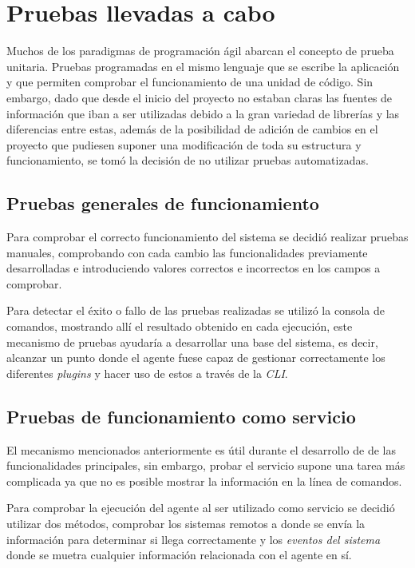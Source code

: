 \section{Pruebas llevadas a cabo} \label{sec:pru}
    
    Muchos de los paradigmas de programación ágil abarcan el concepto de prueba unitaria. Pruebas programadas en el mismo lenguaje que se escribe la aplicación y que permiten comprobar el funcionamiento de una unidad de código. Sin embargo, dado que desde el inicio del proyecto no estaban claras las fuentes de información que iban a ser utilizadas debido a la gran variedad de librerías y las diferencias entre estas, además de la posibilidad de adición de cambios en el proyecto que pudiesen suponer una modificación de toda su estructura y funcionamiento, se tomó la decisión de no utilizar pruebas automatizadas.
    
    \subsection{Pruebas generales de funcionamiento}
        Para comprobar el correcto funcionamiento del sistema se decidió realizar pruebas manuales, comprobando con cada cambio las funcionalidades previamente desarrolladas e introduciendo valores correctos e incorrectos en los campos a comprobar.
        
        Para detectar el éxito o fallo de las pruebas realizadas se utilizó la consola de comandos, mostrando allí el resultado obtenido en cada ejecución, este mecanismo de pruebas ayudaría a desarrollar una base del sistema, es decir, alcanzar un punto donde el agente fuese capaz de gestionar correctamente los diferentes \textit{plugins} y hacer uso de estos a través de la \textit{CLI}.
        
    \subsection{Pruebas de funcionamiento como servicio}
        El mecanismo mencionados anteriormente es útil durante el desarrollo de de las funcionalidades principales, sin embargo, probar el servicio supone una tarea más complicada ya que no es posible mostrar la información en la línea de comandos.
        
        Para comprobar la ejecución del agente al ser utilizado como servicio se decidió utilizar dos métodos, comprobar los sistemas remotos a donde se envía la información para determinar si llega correctamente y los \textit{eventos del sistema} donde se muetra cualquier información relacionada con el agente en sí.
        
